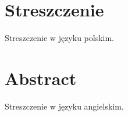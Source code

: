 \section*{Streszczenie}

Streszczenie  w języku polskim.

\section*{Abstract}

Streszczenie  w języku angielskim.